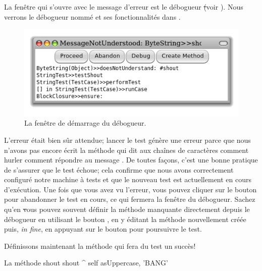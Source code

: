 \documentclass[a4paper,10pt,twoside]{book}
\begin{document}
La fenêtre qui s'ouvre avec le message d'erreur est le débogueur \st (voir ).
Nous verrons le débogueur nommé  et ses
fonctionnalités dans .

\begin{figure}[hbt]

	\centerline {\includegraphics[width=\textwidth]{Predebugger}}
\caption{La fenêtre de démarrage du débogueur.}
\end{figure}

L'erreur était bien sûr attendue; lancer le test génère une
erreur parce que nous n'avons pas encore écrit la méthode qui dit
aux chaînes de caractères comment hurler 
\cad comment répondre au message .
De toutes façons, c'est une bonne pratique de s'assurer que le test
échoue; cela confirme que nous avons correctement
configuré notre machine à tests %
et que le nouveau test est actuellement en cours d'exécution.
Une fois que vous avez vu l'erreur, vous pouvez cliquer sur le bouton
 pour abandonner le test en cours, ce qui fermera la
fenêtre du débogueur.
Sachez qu'en \st vous pouvez souvent définir la méthode manquante
directement depuis le débogueur 
en utilisant le bouton , en y éditant la méthode
nouvellement créée puis, \emph{in fine}, en appuyant sur le bouton
 pour poursuivre le test.

Définissons maintenant la méthode qui fera du test un succès!

\begin{method}[shout]{La méthode shout}
shout
	^ self asUppercase, 'BANG'
\end{method}
\end{document}
